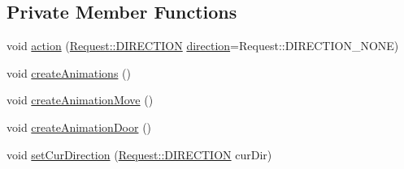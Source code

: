\subsection*{Private Member Functions}
\begin{DoxyCompactItemize}
\item 
void \hyperlink{class_elevator_ac9f33c34d59902f14c72bc86c6c3edb7}{action} (\hyperlink{class_request_a31872cb7919df688dc6866ea607b9d9d}{Request::DIRECTION} \hyperlink{class_elevator_a0e5685fa3ebcfb3c5e4810adc6c5388a}{direction}=Request::DIRECTION\_\-NONE)
\item 
void \hyperlink{class_elevator_a92dbf1fd3ff98c4656ee428b43a35a4c}{createAnimations} ()
\item 
void \hyperlink{class_elevator_aabecded393aa00b30a1f2071b0ae1cdd}{createAnimationMove} ()
\item 
void \hyperlink{class_elevator_a49c56159bb74facd0661c40f621b886f}{createAnimationDoor} ()
\item 
void \hyperlink{class_elevator_ad854f6f6fa0d4c8b6066edc1282fced3}{setCurDirection} (\hyperlink{class_request_a31872cb7919df688dc6866ea607b9d9d}{Request::DIRECTION} curDir)
\end{DoxyCompactItemize}
